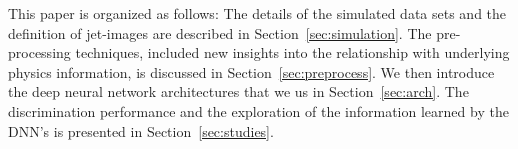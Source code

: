 \documentclass{article}
\begin{document}
This paper is organized as follows:  The details of the simulated data sets and the definition of jet-images are described in Section~\ref{sec:simulation}.    The pre-processing techniques, included new insights into the relationship with underlying physics information, is discussed in Section~\ref{sec:preprocess}.  We then introduce the deep neural network architectures that we us in Section~\ref{sec:arch}.  The discrimination performance and the exploration of the information learned by the DNN's is presented in Section~\ref{sec:studies}.





%
%
%
%
%
%
%



%

%










\clearpage
\newpage

 
\end{document}
